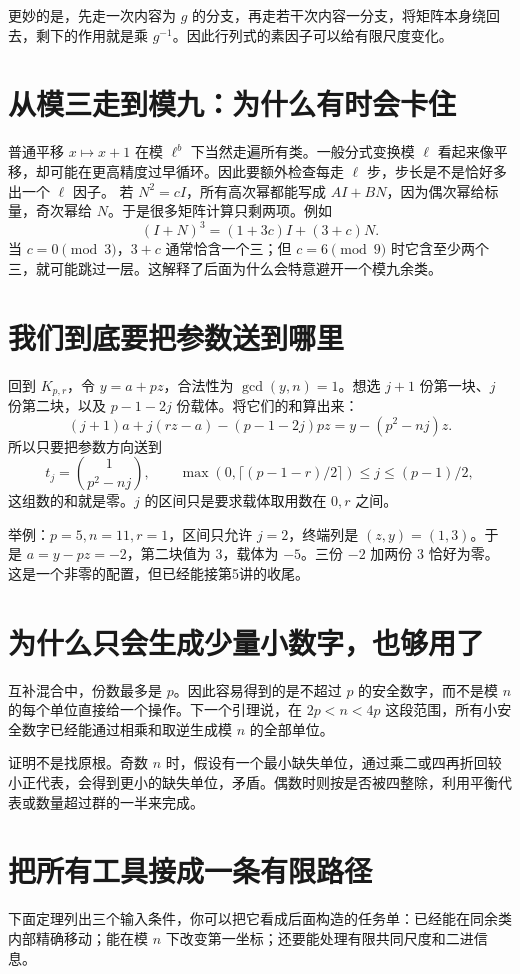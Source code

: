 更妙的是，先走一次内容为 $g$ 的分支，再走若干次内容一分支，将矩阵本身绕回去，剩下的作用就是乘 $g^{-1}$。因此行列式的素因子可以给有限尺度变化。

\section{从模三走到模九：为什么有时会卡住}
普通平移 $x\mapsto x+1$ 在模 $\ell^b$ 下当然走遍所有类。一般分式变换模 $\ell$ 看起来像平移，却可能在更高精度过早循环。因此要额外检查每走 $\ell$ 步，步长是不是恰好多出一个 $\ell$ 因子。
若 $N^2=cI$，所有高次幂都能写成 $A I+B N$，因为偶次幂给标量，奇次幂给 $N$。于是很多矩阵计算只剩两项。例如
\[(I+N)^3=(1+3c)I+(3+c)N.
\]
当 $c=0\pmod3$，$3+c$ 通常恰含一个三；但 $c=6\pmod9$ 时它含至少两个三，就可能跳过一层。这解释了后面为什么会特意避开一个模九余类。

\section{我们到底要把参数送到哪里}
回到 $K_{p,r}$，令 $y=a+pz$，合法性为 $\gcd(y,n)=1$。想选 $j+1$ 份第一块、$j$ 份第二块，以及 $p-1-2j$ 份载体。将它们的和算出来：
\[
(j+1)a+j(rz-a)-(p-1-2j)pz=y-(p^2-nj)z.
\]
所以只要把参数方向送到
\begin{equation}\label{eq:terminal}
t_j=\binom{1}{p^2-nj},\qquad
\max(0,\lceil(p-1-r)/2\rceil)\le j\le(p-1)/2,
\end{equation}
这组数的和就是零。$j$ 的区间只是要求载体取用数在 $0,r$ 之间。

举例：$p=5,n=11,r=1$，区间只允许 $j=2$，终端列是 $(z,y)=(1,3)$。于是 $a=y-pz=-2$，第二块值为 $3$，载体为 $-5$。三份 $-2$ 加两份 $3$ 恰好为零。这是一个非零的配置，但已经能接第5讲的收尾。

\section{为什么只会生成少量小数字，也够用了}
互补混合中，份数最多是 $p$。因此容易得到的是不超过 $p$ 的安全数字，而不是模 $n$ 的每个单位直接给一个操作。下一个引理说，在 $2p<n<4p$ 这段范围，所有小安全数字已经能通过相乘和取逆生成模 $n$ 的全部单位。

证明不是找原根。奇数 $n$ 时，假设有一个最小缺失单位，通过乘二或四再折回较小正代表，会得到更小的缺失单位，矛盾。偶数时则按是否被四整除，利用平衡代表或数量超过群的一半来完成。

\section{把所有工具接成一条有限路径}
下面定理列出三个输入条件，你可以把它看成后面构造的任务单：已经能在同余类内部精确移动；能在模 $n$ 下改变第一坐标；还要能处理有限共同尺度和二进信息。

